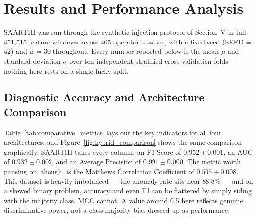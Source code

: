 
\section{Results and Performance Analysis}

SAARTHI was run through the synthetic injection protocol of Section~V in full:
451{,}515 feature windows across 465 operator sessions, with a fixed seed
(SEED = 42) and $w = 30$ throughout. Every number reported below is the mean
$\mu$ and standard deviation $\sigma$ over ten independent stratified
cross-validation folds --- nothing here rests on a single lucky split.

\subsection{Diagnostic Accuracy and Architecture Comparison}

Table~\ref{tab:comparative_metrics} lays out the key indicators for all four
architectures, and Figure~\ref{fig:hybrid_comparison} shows the same
comparison graphically. SAARTHI takes every column: an F1-Score of
$0.952 \pm 0.001$, an AUC of $0.932 \pm 0.002$, and an Average Precision of
$0.991 \pm 0.000$. The metric worth pausing on, though, is the Matthews
Correlation Coefficient of $0.505 \pm 0.008$. This dataset is heavily
imbalanced --- the anomaly rate sits near 88.8\% --- and on a skewed binary
problem, accuracy and even F1 can be flattered by simply siding with the
majority class. MCC cannot. A value around 0.5 here reflects genuine
discriminative power, not a class-majority bias dressed up as performance.

\begin{table}[htbp]
\centering
\caption{Comparative performance metrics (mean $\pm$ std over 10 folds).
All values are computed from \texttt{run\_experiment.py} with \texttt{SEED=42}.}
\label{tab:comparative_metrics}
\end{table}

